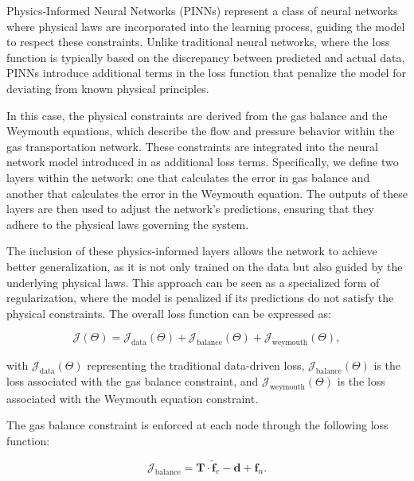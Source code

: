 Physics-Informed Neural Networks (PINNs) represent a class of neural networks where physical laws are incorporated into the learning process, guiding the model to respect these constraints. Unlike traditional neural networks, where the loss function is typically based on the discrepancy between predicted and actual data, PINNs introduce additional terms in the loss function that penalize the model for deviating from known physical principles.

In this case, the physical constraints are derived from the gas balance and the Weymouth equations, which describe the flow and pressure behavior within the gas transportation network. These constraints are integrated into the neural network model introduced in  as additional loss terms. Specifically, we define two layers within the network: one that calculates the error in gas balance and another that calculates the error in the Weymouth equation. The outputs of these layers are then used to adjust the network's predictions, ensuring that they adhere to the physical laws governing the system.

The inclusion of these physics-informed layers allows the network to achieve better generalization, as it is not only trained on the data but also guided by the underlying physical laws. This approach can be seen as a specialized form of regularization, where the model is penalized if its predictions do not satisfy the physical constraints. The overall loss function can be expressed as:

\begin{equation}
   \mathcal{J}(\Theta) = \mathcal{J}_{\text{data}}(\Theta) +  \mathcal{J}_{\text{balance}}(\Theta) +  \mathcal{J}_{\text{weymouth}}(\Theta),     
    \label{eq:PINN_basic_definition}
\end{equation}

\noindent with \( \mathcal{J}_{\text{data}}(\Theta) \) representing the traditional data-driven loss, \( \mathcal{J}_{\text{balance}}(\Theta) \) is the loss associated with the gas balance constraint, and \( \mathcal{J}_{\text{weymouth}}(\Theta) \) is the loss associated with the Weymouth equation constraint. 



The gas balance constraint is enforced at each node through the following loss function:

\begin{equation} \label{eq:gas_balance_GNN}
\mathcal{J}_{\text{balance}} =  \mathbf{T} \cdot \hat{\mathbf{f}}_e - \mathbf{d} + \hat{\mathbf{f}}_n .
\end{equation}

